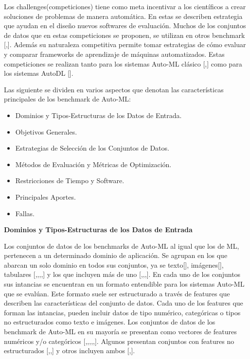 Los challenges(competiciones) tiene como meta incentivar a los científicos a crear soluciones de problemas de manera automática. 
En estas se describen estrategia que ayudan en el diseño nuevos softwares de evaluación. Muchos de los conjuntos de datos que en estas competiciones se proponen, se 
utilizan en otros benchmark [\cite{14},\cite{15}]. 
Además su naturaleza competitiva permite tomar estrategias de cómo evaluar y comparar frameworks de aprendizaje de máquinas automatizados.
Estas competiciones se realizan tanto para los sistemas Auto-ML clásico [\cite{11},\cite{12}] como para los sistemas AutoDL [\cite{29}].

Las siguiente se dividen en varios aspectos que denotan las características principales de los benchmark de Auto-ML:

\begin{itemize}
    \item Dominios y Tipos-Estructuras de los Datos de Entrada.
    \item Objetivos Generales.
    \item Estrategias de Selección de los Conjuntos de Datos.
    \item Métodos de Evaluación y Métricas de Optimización. 
    \item Restricciones de Tiempo y Software.
    \item Principales Aportes.
    \item Fallas. 
    \end{itemize} 

    \begin{flushleft} 
        {\large { \textbf{Dominios y Tipos-Estructuras de los Datos de Entrada}}}\label{subsection:dom Auto-ML}
\end{flushleft}

Los conjuntos de datos de los benchmarks de Auto-ML al igual que los de ML, pertenecen a un determinado dominio de aplicación. Se agrupan en los que abarcan un 
solo dominio en todos sus conjuntos, ya se texto[\cite{20}], imágenes[\cite{23}], tabulares [\cite{14},\cite{25},\cite{26},\cite{30},\cite{32}] y los que incluyen más 
de uno [\cite{10},\cite{16},\cite{26},\cite{31}]. 
En cada uno de los conjuntos sus intancias se encuentran en un formato entendible para los sistemas Auto-ML que se evalúan. 
Este formato suele ser estructurado a través de features que describen las características del conjunto de datos. 
Cada uno de los features que forman las intancias, pueden incluir datos de tipo numérico, categóricas o tipos no estructurados 
como texto e imágenes. Los conjuntos de datos de los benchmark de Auto-ML en su mayoría se presentan como vectores de features numéricos y/o categóricos 
[\cite{10},\cite{11},\cite{15},\cite{18},\cite{19},\cite{31}]. Algunos presentan conjuntos con features no estructurados [\cite{13},\cite{20},\cite{23}] y 
otros incluyen ambos [\cite{21},\cite{29}].

